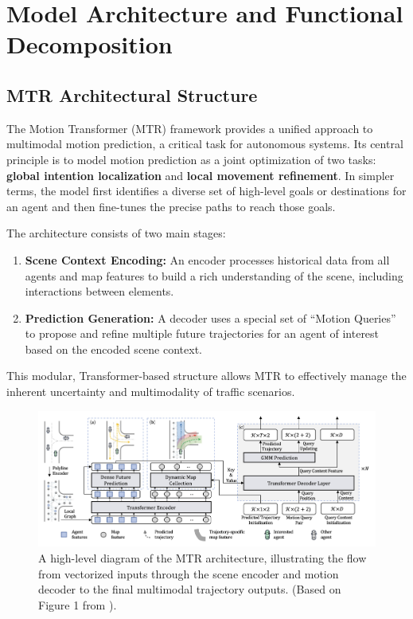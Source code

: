 \section{Model Architecture and Functional Decomposition}
\label{ch:model_architecture}

\subsection{MTR Architectural Structure}
\label{sec:model_mtr_architecture}

The Motion Transformer (MTR) framework provides a unified approach to multimodal motion prediction, a critical task for autonomous systems. Its central principle is to model motion prediction as a joint optimization of two tasks: \textbf{global intention localization} and \textbf{local movement refinement}. In simpler terms, the model first identifies a diverse set of high-level goals or destinations for an agent and then fine-tunes the precise paths to reach those goals.

The architecture consists of two main stages:
\begin{enumerate}
    \item \textbf{Scene Context Encoding:} An encoder processes historical data from all agents and map features to build a rich understanding of the scene, including interactions between elements.
    \item \textbf{Prediction Generation:} A decoder uses a special set of ``Motion Queries'' to propose and refine multiple future trajectories for an agent of interest based on the encoded scene context.
\end{enumerate}

This modular, Transformer-based structure allows MTR to effectively manage the inherent uncertainty and multimodality of traffic scenarios.

\begin{figure}[htbp]
    \centering
    \includegraphics[width=\textwidth]{figures/mtr_overall_architecture_detail.png}
    \caption{A high-level diagram of the MTR architecture, illustrating the flow from vectorized inputs through the scene encoder and motion decoder to the final multimodal trajectory outputs. (Based on Figure 1 from \cite{Shi2022MTR}).}
    \label{fig:mtr_architecture}
\end{figure}

